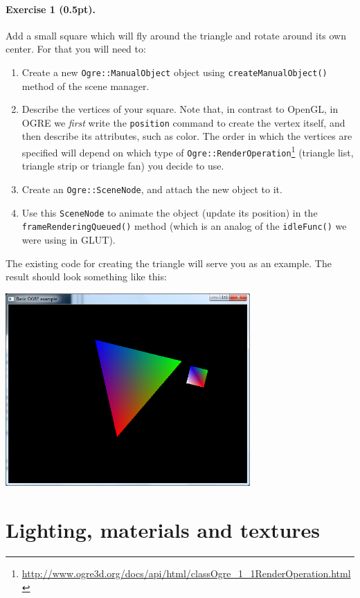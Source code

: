\documentclass{article}
\newenvironment{exercise}[2]{\paragraph{Exercise #1 (#2pt).} }{
\medskip}
\begin{document}
\begin{exercise}{1}{0.5}
Add a small square which will fly around the triangle and rotate around its own center. For that you will need to:
\begin{enumerate}
	\item Create a new \verb#Ogre::ManualObject# object using \verb#createManualObject()# method of the scene manager.
	\item Describe the vertices of your square. Note that, in contrast to OpenGL, in OGRE we \emph{first} write the \texttt{position} command to create the vertex itself, and then describe its attributes, such as color. The order in which the vertices are specified will depend on which type of \verb#Ogre::RenderOperation#\footnote{\url{http://www.ogre3d.org/docs/api/html/classOgre_1_1RenderOperation.html}} (triangle list, triangle strip or triangle fan) you decide to use. 
	\item Create an \verb#Ogre::SceneNode#, and attach the new object to it.
	\item Use this \verb#SceneNode# to animate the object (update its position) in the \verb#frameRenderingQueued()# method (which is an analog of the \verb#idleFunc()# we were using in GLUT).
\end{enumerate}
The existing code for creating the triangle will serve you as an example. The result should look something like this:
\begin{center}
\includegraphics[width=0.7\textwidth]{ex1.png}
\end{center}
\end{exercise}

\section{Lighting, materials and textures}
\end{document}
